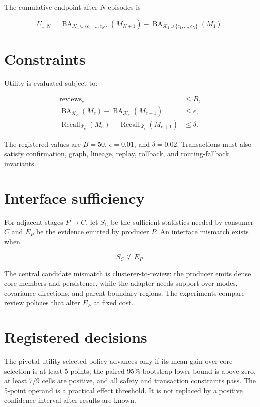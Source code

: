 \documentclass[12pt,oneside]{report}
\newcommand{\ba}{\operatorname{BA}}
\newcommand{\utility}{U}
\begin{document}
The cumulative endpoint after $N$ episodes is

\begin{equation}
\utility_{1:N} =
\ba_{\mathcal{K}_1\cup\{c_1,\ldots,c_N\}}(M_{N+1})
-
\ba_{\mathcal{K}_1\cup\{c_1,\ldots,c_N\}}(M_1).
\end{equation}

\section{Constraints}

Utility is evaluated subject to:

\begin{align}
\text{reviews}_e &\leq B,\\
\ba_{\mathcal{K}_e}(M_e)-\ba_{\mathcal{K}_e}(M_{e+1})
&\leq \epsilon,\\
\operatorname{Recall}_{\mathcal{R}_e}(M_e)-
\operatorname{Recall}_{\mathcal{R}_e}(M_{e+1})
&\leq \delta.
\end{align}

The registered values are $B=50$, $\epsilon=0.01$, and $\delta=0.02$.
Transactions must also satisfy confirmation, graph, lineage, replay, rollback,
and routing-fallback invariants.

\section{Interface sufficiency}

For adjacent stages $P\rightarrow C$, let $S_C$ be the sufficient statistics
needed by consumer $C$ and $E_P$ be the evidence emitted by producer $P$. An
interface mismatch exists when

\begin{equation}
S_C \nsubseteq E_P.
\end{equation}

The central candidate mismatch is clusterer-to-review: the producer emits dense
core members and persistence, while the adapter needs support over modes,
covariance directions, and parent-boundary regions. The experiments compare
review policies that alter $E_P$ at fixed cost.

\section{Registered decisions}

The pivotal utility-selected policy advances only if its mean gain over core
selection is at least 5 points, the paired 95\% bootstrap lower bound is above
zero, at least 7/9 cells are positive, and all safety and transaction
constraints pass. The 5-point operand is a practical effect threshold. It is
not replaced by a positive confidence interval after results are known.
\end{document}
